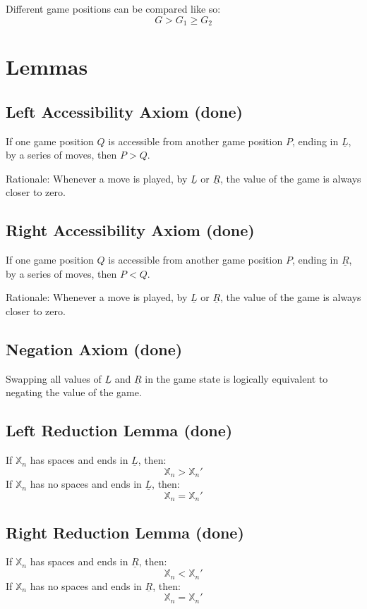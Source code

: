 \documentclass[11pt]{article}
\begin{document}
Different game positions can be compared like so:
$$G > G_{1} \ge G_{2}$$

\section*{Lemmas}
\label{sec:org2a07434}
\subsection*{Left Accessibility Axiom (done)}
\label{sec:org0fd5709}
If one game position \(Q\) is accessible from another game position \(P\), ending in \(\underline{L}\), by a series of moves, then \(P > Q\).

Rationale:
Whenever a move is played, by \(\underline{L}\) or \(\underline{R}\), the value of the game is always closer to zero.

\subsection*{Right Accessibility Axiom (done)}
\label{sec:orgcfcd220}
If one game position \(Q\) is accessible from another game position \(P\), ending in \(\underline{R}\), by a series of moves, then \(P < Q\).

Rationale:
Whenever a move is played, by \(\underline{L}\) or \(\underline{R}\), the value of the game is always closer to zero.

\subsection*{Negation Axiom (done)}
\label{sec:org0477d7d}
Swapping all values of \(\underline{L}\) and \(\underline{R}\) in the game state is logically equivalent to negating the value of the game.

\subsection*{Left Reduction Lemma (done)}
\label{sec:org2324387}
If \(\mathbb{X}_{n}\) has spaces and ends in \(\underline{L}\), then:
$$\mathbb{X}_{n} > \mathbb{X}_{n}'$$
If \(\mathbb{X}_{n}\) has no spaces and ends in \(\underline{L}\), then:
$$\mathbb{X}_{n} = \mathbb{X}_{n}'$$

\subsection*{Right Reduction Lemma (done)}
\label{sec:org178002c}
If \(\mathbb{X}_{n}\) has spaces and ends in \(\underline{R}\), then:
$$\mathbb{X}_{n} < \mathbb{X}_{n}'$$
If \(\mathbb{X}_{n}\) has no spaces and ends in \(\underline{R}\), then:
$$\mathbb{X}_{n} = \mathbb{X}_{n}'$$
\end{document}
